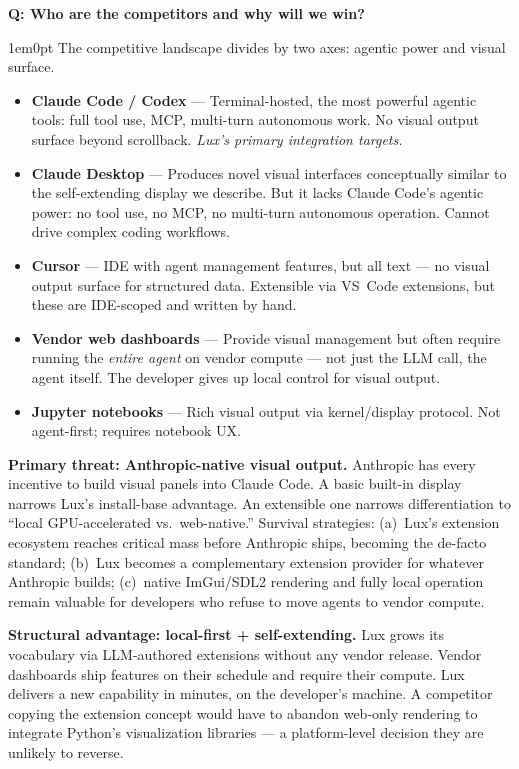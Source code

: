 \documentclass[11pt,letterpaper]{article}
\newcounter{faqnum}
\newenvironment{faqpair}[1]{%
  \needspace{4\baselineskip}%
  \vspace{0.5em}%
  \refstepcounter{faqnum}%
  \noindent\textbf{\color{SectionBlue}Q\thefaqnum: #1}\par\nopagebreak[4]%
  \vspace{0.2em}%
  \begin{adjustwidth}{1em}{0pt}%
  \setlength{\parindent}{0pt}%
}{%
  \end{adjustwidth}%
  \vspace{0.5em}%
}
\begin{document}
\begin{faqpair}{Who are the competitors and why will we win?}\label{faq:competitors}
  The competitive landscape divides by two axes: agentic power and visual
  surface.

  \begin{itemize}[nosep]
    \item \textbf{Claude Code / Codex} --- Terminal-hosted, the most
      powerful agentic tools: full tool use, MCP, multi-turn autonomous
      work.  No visual output surface beyond scrollback.  \emph{Lux's
      primary integration targets.}
    \item \textbf{Claude Desktop} --- Produces novel visual interfaces
      conceptually similar to the self-extending display we describe.
      But it lacks Claude Code's agentic power: no tool use, no MCP, no
      multi-turn autonomous operation.  Cannot drive complex coding
      workflows.
    \item \textbf{Cursor} --- IDE with agent management features, but all
      text --- no visual output surface for structured data.  Extensible
      via VS~Code extensions, but these are IDE-scoped and written by hand.
    \item \textbf{Vendor web dashboards} --- Provide visual management but
      often require running the \emph{entire agent} on vendor compute ---
      not just the LLM call, the agent itself.  The developer gives up
      local control for visual output.
    \item \textbf{Jupyter notebooks} --- Rich visual output via
      kernel/display protocol.  Not agent-first; requires notebook UX.
  \end{itemize}

  \textbf{Primary threat: Anthropic-native visual output.}  Anthropic has
  every incentive to build visual panels into Claude Code.  A basic
  built-in display narrows Lux's install-base advantage.  An extensible
  one narrows differentiation to ``local GPU-accelerated vs.\ web-native.''
  Survival strategies: (a)~Lux's extension ecosystem reaches critical mass
  before Anthropic ships, becoming the de-facto standard; (b)~Lux becomes
  a complementary extension provider for whatever Anthropic builds;
  (c)~native ImGui/SDL2 rendering and fully local operation remain valuable
  for developers who refuse to move agents to vendor compute.

  \textbf{Structural advantage: local-first + self-extending.}  Lux grows
  its vocabulary via LLM-authored extensions without any vendor release.
  Vendor dashboards ship features on their schedule and require their
  compute.  Lux delivers a new capability in minutes, on the developer's
  machine.  A competitor copying the extension concept would have to abandon
  web-only rendering to integrate Python's visualization libraries ---
  a platform-level decision they are unlikely to reverse.
\end{faqpair}
\end{document}
